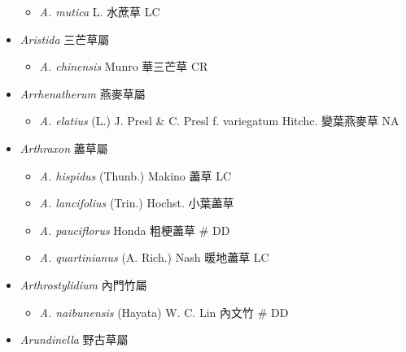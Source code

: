 \begin{itemize}
  \begin{itemize}
        \item[] \textit{A. mutica} L.  水蔗草   LC
  \end{itemize}
 \item[] \textit{Aristida} 三芒草屬
                                
  \begin{itemize}
        \item[] \textit{A. chinensis} Munro  華三芒草   CR
  \end{itemize}
 \item[] \textit{Arrhenatherum} 燕麥草屬
                                
  \begin{itemize}
        \item[] \textit{A. elatius} (L.) J. Presl \& C. Presl f. variegatum Hitchc.  變葉燕麥草   NA
  \end{itemize}
 \item[] \textit{Arthraxon} 藎草屬
                                
  \begin{itemize}
        \item[] \textit{A. hispidus} (Thunb.) Makino  藎草   LC
        \item[] \textit{A. lancifolius} (Trin.) Hochst.  小葉藎草   
        \item[] \textit{A. pauciflorus} Honda  粗梗藎草  \# DD
        \item[] \textit{A. quartinianus} (A. Rich.) Nash  暖地藎草   LC
  \end{itemize}
 \item[] \textit{Arthrostylidium} 內門竹屬
                                
  \begin{itemize}
        \item[] \textit{A. naibunensis} (Hayata) W. C. Lin  內文竹  \# DD
  \end{itemize}
 \item[] \textit{Arundinella} 野古草屬
                                

\end{itemize}
